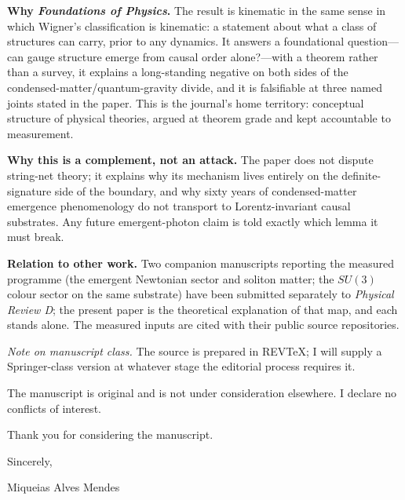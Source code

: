 \documentclass[11pt]{article}
\begin{document}
\textbf{Why \emph{Foundations of Physics}.} The result is kinematic in the
same sense in which Wigner's classification is kinematic: a statement about
what a class of structures can carry, prior to any dynamics. It answers a
foundational question---can gauge structure emerge from causal order
alone?---with a theorem rather than a survey, it explains a long-standing
negative on both sides of the condensed-matter/quantum-gravity divide, and it
is falsifiable at three named joints stated in the paper. This is the
journal's home territory: conceptual structure of physical theories, argued
at theorem grade and kept accountable to measurement.

\textbf{Why this is a complement, not an attack.} The paper does not dispute
string-net theory; it explains why its mechanism lives entirely on the
definite-signature side of the boundary, and why sixty years of
condensed-matter emergence phenomenology do not transport to
Lorentz-invariant causal substrates. Any future emergent-photon claim is told
exactly which lemma it must break.

\textbf{Relation to other work.} Two companion manuscripts reporting the
measured programme (the emergent Newtonian sector and soliton matter; the
$SU(3)$ colour sector on the same substrate) have been submitted separately
to \emph{Physical Review D}; the present paper is the theoretical explanation
of that map, and each stands alone. The measured inputs are cited with their
public source repositories.

\emph{Note on manuscript class.} The source is prepared in REVTeX; I will
supply a Springer-class version at whatever stage the editorial process
requires it.

The manuscript is original and is not under consideration elsewhere. I
declare no conflicts of interest.

Thank you for considering the manuscript.

\vspace{10pt}
\noindent Sincerely,

\vspace{4pt}
\noindent Miqueias Alves Mendes
\end{document}
